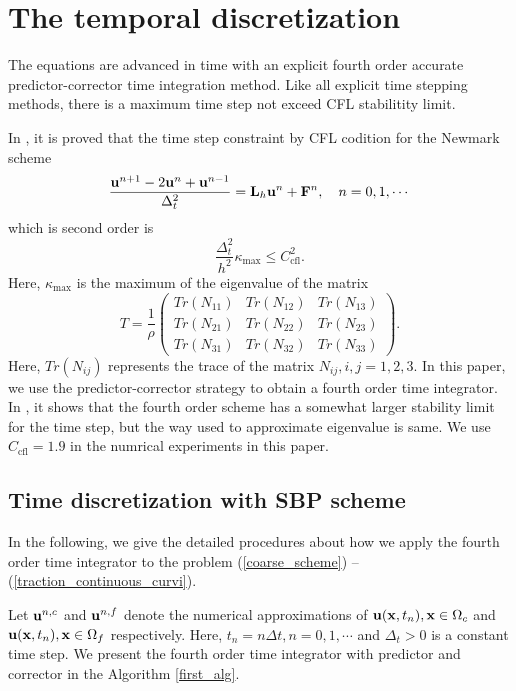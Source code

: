\documentclass[a4paper]{article}
\begin{document}
\section{The temporal discretization}
The equations are advanced in time with an explicit fourth order accurate predictor-corrector time integration method. Like all explicit time stepping methods, there is a maximum time step not exceed CFL stabilitity limit.

In \cite{?}, it is proved that the time step constraint by CFL codition for the Newmark scheme 
\begin{equation*}
\frac{{\bf u}^{n+1}-2{\bf u}^n + {\bf u}^{n-1}}{\Delta_t^2} = {\bf L}_h{\bf u}^n + {\bf F}^n, \ \ \ n = 0,1,\cdots
\end{equation*}
 which is second order is
\begin{equation*}
\frac{\Delta_t^2}{h^2}\kappa_{\text{max}}\leq C_{\text{cfl}}^2.
\end{equation*}
Here, 
$\kappa_{\text{max}}$ is the maximum of the eigenvalue of the matrix 
\[T = \frac{1}{\rho}\left(\begin{array}{ccc}
Tr(N_{11}) &  Tr(N_{12})& Tr(N_{13})\\
Tr(N_{21}) & Tr(N_{22}) & Tr(N_{23})\\
Tr(N_{31}) & Tr(N_{32}) & Tr(N_{33})\end{array}\right). \]
Here, $Tr(N_{ij})$ represents the trace of the matrix $N_{ij},i,j = 1,2,3$. In this paper, we use the predictor-corrector strategy to obtain a fourth order time integrator. In \cite{?}, it shows that the fourth order scheme has a somewhat larger stability limit for the time step, but the way used to approximate eigenvalue is same. We use $C_{\text{cfl}} = 1.9$ in the numrical experiments in this paper.

\subsection{Time discretization with SBP scheme}
In the following, we give the detailed procedures about how we apply the fourth order time integrator to the problem (\ref{coarse_scheme}) -- (\ref{traction_continuous_curvi}). 

Let ${\bf u}^{n,c}$ and ${\bf u}^{n,f}$ denote the numerical approximations of ${\bf u}({\bf x},t_n), {\bf x}\in\Omega_c$ and ${\bf u}({\bf x},t_n), {\bf x}\in\Omega_f$ respectively. Here, $t_n = n\Delta t, n = 0,1,\cdots$ and $\Delta_t > 0$ is a constant time step. We present the fourth order time integrator with predictor and corrector in the Algorithm \ref{first_alg}.
\end{document}
